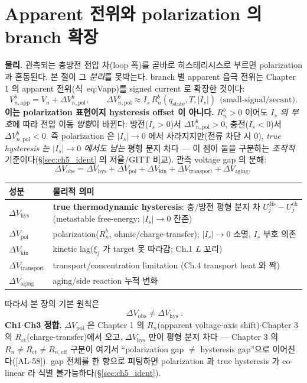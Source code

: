 \documentclass[11pt,a4paper]{article}
\newcommand{\eff}{\mathrm{eff}}
\newcommand{\app}{\mathrm{app}}
\newcommand{\ct}{\mathrm{ct}}
\newcommand{\transp}{\mathrm{transport}}
\newcommand{\dis}{\mathrm{dis}}
\newcommand{\chg}{\mathrm{ch}}
\newcommand{\hys}{\mathrm{hys}}
\newcommand{\pol}{\mathrm{pol}}
\newcommand{\kin}{\mathrm{kin}}
\newcommand{\obs}{\mathrm{obs}}
\newcommand{\stt}{\mathrm{state}}
\newcommand{\AL}[1]{\textsf{[AL-#1]}}
\begin{document}
\section{Apparent 전위와 polarization 의 branch 확장}\label{sec:ch5_apparent}
\textbf{물리.} 관측되는 충방전 전압 차(loop 폭)를 곧바로 히스테리시스로 부르면 polarization 과 혼동된다. 본
절이 그 \emph{분리}를 못박는다. branch 별 apparent 음극 전위는 Chapter 1 의 apparent 전위(식~eq:Vapp)를 signed
current 로 확장한 것이다:
\begin{equation}
V_{n,\app}^b=V_n+\Delta V_{n,\pol}^b,\qquad
\Delta V_{n,\pol}^b\approx I_s\,R_n^b(q_\stt,T,|I_s|)\ \ \text{(small-signal/secant)}.
\label{eq:ch5_vapp_branch}
\end{equation}
\textbf{이는 polarization 표현이지 hysteresis offset 이 아니다.} $R_n^b>0$ 이어도 \emph{$I_s$ 의 부호}에 따라
전압 이동 \emph{방향}이 바뀐다: 방전($I_s>0$)서 $\Delta V_{n,\pol}^b>0$, 충전($I_s<0$)서 $\Delta V_{n,\pol}^b<0$.
즉 polarization 은 $|I_s|\to0$ 에서 사라지지만(전류 차단 시 0), \emph{true hysteresis 는 $|I_s|\to0$ 에서도
남는} 평형 분지 차다 — 이 점이 둘을 구분하는 \emph{조작적} 기준이다(\S\ref{sec:ch5_ident} 의 저율/GITT 비교).
관측 voltage gap 의 분해:
\begin{equation}
\Delta V_\obs=\Delta V_\hys+\Delta V_\pol+\Delta V_\kin+\Delta V_\transp+\Delta V_{\mathrm{aging}},
\label{eq:ch5_gap_decomp}
\end{equation}
\begin{longtable}{p{} >{\raggedright\arraybackslash}p{}}
\toprule 성분 & 물리적 의미 \\ \midrule \endhead
$\Delta V_\hys$ & \textbf{true thermodynamic hysteresis}: 충/방전 평형 분지 차 $U_j^\dis-U_j^\chg$ (metastable free-energy; $|I_s|\to0$ 잔존) \\
$\Delta V_\pol$ & polarization($R_n^b$, ohmic/charge-transfer); $|I_s|\to0$ 소멸, $I_s$ 부호 의존 \\
$\Delta V_\kin$ & kinetic lag($\xi_j$ 가 target 못 따라감; Ch.1 $L$ 꼬리) \\
$\Delta V_\transp$ & transport/concentration limitation (Ch.4 transport heat 와 짝) \\
$\Delta V_{\mathrm{aging}}$ & aging/side reaction 누적 변화 \\
\bottomrule
\end{longtable}
따라서 본 장의 기본 원칙은
\begin{equation}
\boxed{\;\Delta V_\obs\ne\Delta V_\hys\;.}
\label{eq:ch5_obs_not_hys}
\end{equation}
\textbf{Ch1$\cdot$Ch3 정합.} $\Delta V_\pol$ 은 Chapter 1 의 $R_n$(apparent voltage-axis shift)$\cdot$Chapter 3
의 $R_\ct$(charge-transfer)에서 오고, $\Delta V_\hys$ 만이 평형 분지 차다 — Chapter 3 의 $R_n\ne R_\ct\ne R_{n,\eff}$
구분이 여기서 ``polarization gap $\ne$ hysteresis gap''으로 이어진다(\AL{58}). gap 전체를 한 항으로 피팅하면
polarization 과 true hysteresis 가 co-linear 라 식별 불가능하다(\S\ref{sec:ch5_ident}).
\end{document}

